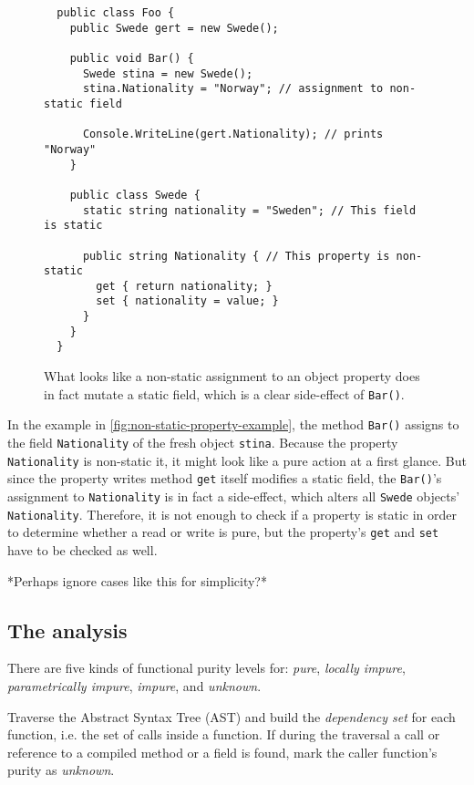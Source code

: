 \documentclass[a4paper,12pt]{article}
\begin{document}
\begin{figure}[H]
  \centering
  \begin{lstlisting}
  public class Foo {
    public Swede gert = new Swede();

    public void Bar() {
      Swede stina = new Swede();
      stina.Nationality = "Norway"; // assignment to non-static field

      Console.WriteLine(gert.Nationality); // prints "Norway"
    }

    public class Swede {
      static string nationality = "Sweden"; // This field is static

      public string Nationality { // This property is non-static
        get { return nationality; }
        set { nationality = value; }
      }
    }
  }
  \end{lstlisting}
  \caption{What looks like a non-static assignment to an object property does in fact mutate a static field, which is a clear side-effect of \texttt{Bar()}.}
  \label{fig:non-static-property-example}
\end{figure}

In the example in \autoref{fig:non-static-property-example}, the method \texttt{Bar()} assigns to the field \texttt{Nationality} of the fresh object \texttt{stina}. Because the property \texttt{Nationality} is non-static it, it might look like a pure action at a first glance. But since the property writes method \texttt{get} itself modifies a static field, the \texttt{Bar()}'s assignment to \texttt{Nationality} is in fact a side-effect, which alters all \texttt{Swede} objects' \texttt{Nationality}. Therefore, it is not enough to check if a property is static in order to determine whether a read or write is pure, but the property's \texttt{get} and \texttt{set} have to be checked as well.

*Perhaps ignore cases like this for simplicity?*

\subsection{The analysis} \label{sub:Analysis}
There are five kinds of functional purity levels for: \textit{pure}, \textit{locally impure}, \textit{parametrically impure}, \textit{impure}, and \textit{unknown}.

Traverse the Abstract Syntax Tree (AST) and build the \textit{dependency set} for each function, i.e. the set of calls inside a function. If during the traversal a call or reference to a compiled method or a field is found, mark the caller function's purity as \textit{unknown}.
\end{document}
